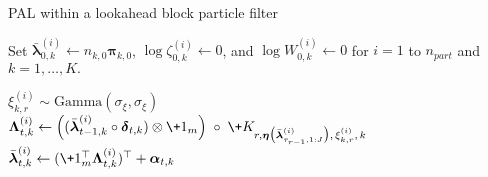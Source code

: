\documentclass{article}
\newcommand{\bs}{\boldsymbol}
\begin{document}
\begin{algorithm}
\caption{PAL within a lookahead block particle filter}\label{alg:measles_block_lookahead}
\begin{algorithmic}[1]

 Set $\bar{\bs \lambda}_{0,k}^{(i)} \leftarrow  n_{k,0} \bs \pi_{k,0}$, 
  $\log \zeta_{0,k}^{(i)} \leftarrow 0$, 
  and $\log W_{0,k}^{(i)} \leftarrow 0$ 
  for $i = 1$ to $n_{part}$ and $k = 1, \dots, K.$

      \STATE $\xi_{k,r}^{(i)} \sim \mathrm{Gamma}(\sigma_{\xi}, \sigma_{\xi})$
        \STATE \label{measlespred1}%
          $\bs \Lambda_{t,k}^{(i)} \leftarrow  
           \Bigl((\bar{\bs \lambda}^{(i)}_{t-1,k} \circ \bs \delta_{t,k}) 
           \otimes \+1_m\Bigr)
           \;\circ\;
           \+K_{r,\bs \eta\bigl(\bar{ \bs \lambda}_{\tau_{r-1},1:J}^{(i)}\bigr),\,
                \xi_{k,r}^{(i)},\,k}$
        \STATE
          $\bar{\bs \lambda}^{(i)}_{t,k} \leftarrow  
            (\+1_m^\top \bs \Lambda_{t,k}^{(i)})^\top + \bs \alpha_{t,k}$
      \ENDFOR


\end{algorithmic}
\end{algorithm}
\end{document}
